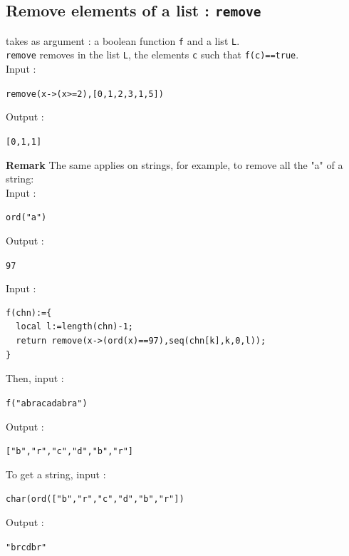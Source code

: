 \documentclass[a4paper,11pt]{book}
\begin{document}
\subsection{Remove elements of a list : {\tt remove}}
 takes as argument : a  boolean function {\tt f} and 
a list {\tt L}.\\
{\tt remove} removes in the list {\tt L}, the elements {\tt c} such that 
{\tt f(c)==true}.\\
Input :
\begin{center}{\tt remove(x->(x>=2),[0,1,2,3,1,5])}\end{center}
Output :
\begin{center}{\tt  [0,1,1]}\end{center}
{\bf Remark} The same applies on strings, for example,
to remove all the "a" of a string:\\
Input :
\begin{center}{\tt ord("a")}\end{center}
Output :
\begin{center}{\tt  97}\end{center}
Input :
\begin{verbatim}
f(chn):={
  local l:=length(chn)-1;
  return remove(x->(ord(x)==97),seq(chn[k],k,0,l));
}
\end{verbatim}
Then, input :
\begin{center}{\tt f("abracadabra")}\end{center}
Output :
\begin{center}{\tt  ["b","r","c","d","b","r"]}\end{center}
To get a string, input :
\begin{center}{\tt  char(ord(["b","r","c","d","b","r"])}\end{center}
Output :
\begin{center}{\tt "brcdbr"}\end{center}
\end{document}
